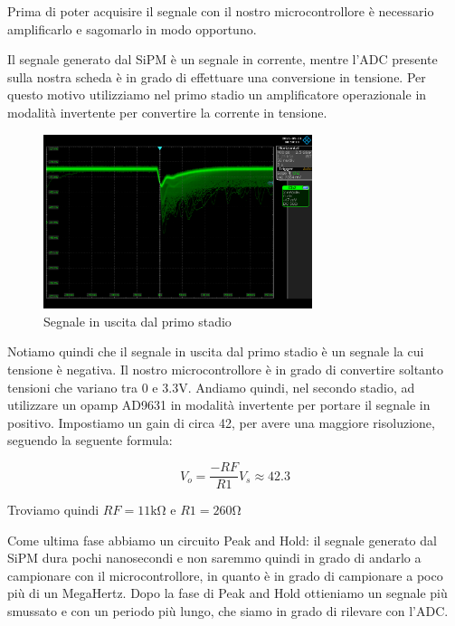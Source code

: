 Prima di poter acquisire il segnale con il nostro microcontrollore è necessario amplificarlo e sagomarlo in modo opportuno.

Il segnale generato dal SiPM è un segnale in corrente, mentre l'ADC presente sulla nostra scheda è in grado di effettuare una conversione in tensione.
Per questo motivo utilizziamo nel primo stadio un amplificatore operazionale in modalità invertente per convertire la corrente in tensione.

\begin{figure}[H]
\centering
\includegraphics[width=0.7\textwidth]{assets/exp9/primo_stadio.png}
\caption{Segnale in uscita dal primo stadio}
\end{figure}

Notiamo quindi che il segnale in uscita dal primo stadio è un segnale la cui tensione è negativa.
Il nostro microcontrollore è in grado di convertire soltanto tensioni che variano tra 0 e 3.3V.
Andiamo quindi, nel secondo stadio, ad utilizzare un opamp AD9631 in modalità invertente per portare il segnale in positivo. Impostiamo un gain di circa 42, per avere una maggiore risoluzione, seguendo la seguente formula:

\begin{displaymath}
V_o = \frac{-RF}{R1} V_s \approx 42.3
\end{displaymath}

Troviamo quindi  $RF = 11 \si{\kilo\ohm}$ e $ R1 = 260 \si{\ohm}$

Come ultima fase abbiamo un circuito Peak and Hold: il segnale generato dal SiPM dura pochi nanosecondi e non saremmo quindi in grado di andarlo a campionare con il microcontrollore, in quanto è in grado di campionare a poco più di un MegaHertz. Dopo la fase di Peak and Hold ottieniamo un segnale più smussato e con un periodo più lungo, che siamo in grado di rilevare con l'ADC.

